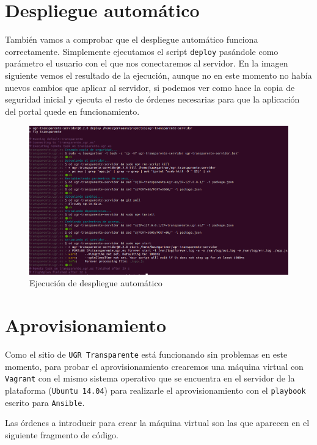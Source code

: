 \section{Despliegue automático}

También vamos a comprobar que el despliegue automático funciona correctamente. Simplemente ejecutamos el script {\tt deploy} pasándole como parámetro el usuario con el que nos conectaremos al servidor. En la imagen siguiente vemos el resultado de la ejecución, aunque no en este momento no había nuevos cambios que aplicar al servidor, si podemos ver como hace la copia de seguridad inicial y ejecuta el resto de órdenes necesarias para que la aplicación del portal quede en funcionamiento.

\begin{figure}[!ht]
	\begin{center}
		\includegraphics[width=1\textwidth]{../images/deploy.png}
		\caption{Ejecución de despliegue automático}
		\label{fig:deploy}
	\end{center}
\end{figure}

\newpage
\section{Aprovisionamiento}

Como el sitio de {\tt UGR Transparente} está funcionando sin problemas en este momento, para probar el aprovisionamiento crearemos una máquina virtual con {\tt Vagrant} con el mismo sistema operativo que se encuentra en el servidor de la plataforma ({\tt Ubuntu 14.04}) para realizarle el aprovisionamiento con el {\tt playbook} escrito para {\tt Ansible}.

\bigskip
Las órdenes a introducir para crear la máquina virtual son las que aparecen en el siguiente fragmento de código.


